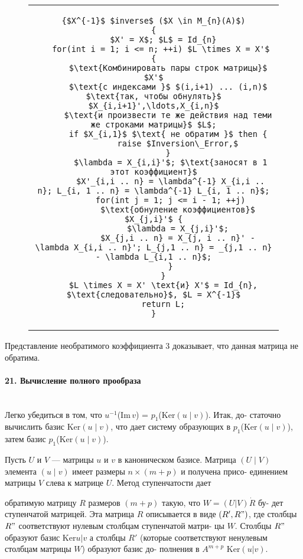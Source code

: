 \documentclass{mai_book}
\begin{document}
{\begin{figure}[htp]
\begin{tabular}{c}
\begin{lstlisting}[mathescape=true, captionpos={bo}, caption={Обращение матрицы в кольце главных идеалов}]
{$X^{-1}$ $inverse$ ($X \in M_{n}(A)$)
{
	$X' = X$; $L$ = Id_{n}
   for(int i = 1; i <= n; ++i) $L \times X = X'$ {
      $\text{Комбинировать пары строк матрицы}$ $X'$
      $\text{с индексами }$ $(i,i+1) ... (i,n)$ $\text{так, чтобы обнулять}$ $X_{i,i+1}',\ldots,X_{i,n}$
      $\text{и произвести те же действия над теми же строками матрицы}$ $L$;
      if $X_{i,1}$ $\text{ не обратим }$ then {
          raise $Inversion\_Error,$
      }
	   $\lambda = X_{i,i}'$; $\text{заносят в 1 этот коэффициент}$
	   $X'_{i,i .. n} = \lambda^{-1} X_{i,i .. n}; L_{i, 1 .. n} = \lambda^{-1} L_{i, 1 .. n}$;
	   for(int j = 1; j <= i - 1; ++j)
          $\text{обнуление коэффициентов}$ $X_{j,i}'$ {
	      $\lambda = X_{j,i}'$;
	      $X_{j,i .. n} = X_{j, i .. n}' - \lambda X_{i,i .. n}'; L_{j,1 .. n} = _{j,1 .. n} - \lambda L_{i,1 .. n}$;
	   }
    }
    $L \times X = X' \text{и} X'$ = Id_{n}, $\text{следовательно}$, $L = X^{-1}$
    return L;
}
\end{lstlisting}
\end{tabular}
\end{figure}

\noindent Представление необратимого коэффициента 3 доказывает, что данная
матрица не обратима.

\paragraph{21. Вычисление полного прообраза} \mbox{}\\

Легко убедиться в том, что $u^{-1}$(Im\,$v$) = $p_{1}$(Ker$(u \;|\; v)$). Итак, до-
статочно вычислить базис Ker$(u \;|\; v)$, что дает систему образующих в
$p_{1}$(Ker$(u \;|\; v)$), затем базис $p_{1}$(Ker$(u \;|\; v)$).

Пусть $U$ и $V$ --- матрицы $u$ и $v$ в каноническом базисе. Матрица
$(U \;|\; V)$ элемента $(u \;|\; v)$ имеет размеры $n \times (m+p)$ и получена присо-
единением матрицы $V$ слева к матрице $U$. Метод ступенчатости дает

\noindent обратимую матрицу $R$ размеров $(m+p)$ такую, что $W = (U | V) \dot R$ бу-
дет ступенчатой матрицей. Эта матрица $R$ описывается в виде $(R',R")$,
где столбцы $R"$ соответствуют нулевым столбцам ступенчатой матри-
цы $W$. Столбцы $R"$ образуют базис Ker{$u | v$} а столбцы $R'$ (которые
соответствуют ненулевым столбцам матрицы $W$) образуют базис до-
полнения в $A^{m+p}$ Ker{$(u | v)$}.

}
\end{document}
